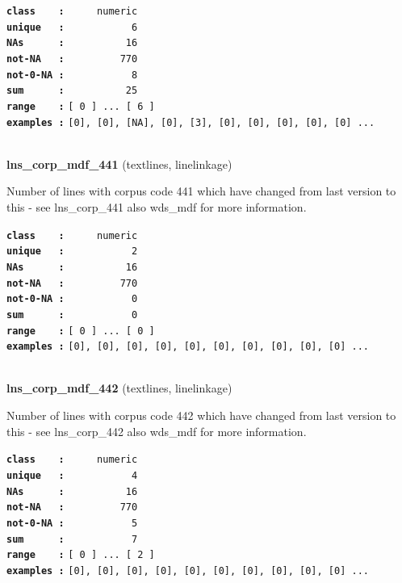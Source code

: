 \documentclass[]{article}
\begin{document}
\textbf{\texttt{class\ \ \ \ :}} \texttt{~~~~~numeric}\\
\textbf{\texttt{unique\ \ \ :}} \texttt{~~~~~~~~~~~6}\\
\textbf{\texttt{NAs\ \ \ \ \ \ :}} \texttt{~~~~~~~~~~16}\\
\textbf{\texttt{not-NA\ \ \ :}} \texttt{~~~~~~~~~770}\\
\textbf{\texttt{not-0-NA\ :}} \texttt{~~~~~~~~~~~8}\\
\textbf{\texttt{sum\ \ \ \ \ \ :}} \texttt{~~~~~~~~~~25}\\
\textbf{\texttt{range\ \ \ \ :}}
\texttt{{[}\ 0\ {]}\ ...\ {[}\ 6\ {]}}\\
\textbf{\texttt{examples\ :}}
\texttt{{[}0{]},\ {[}0{]},\ {[}NA{]},\ {[}0{]},\ {[}3{]},\ {[}0{]},\ {[}0{]},\ {[}0{]},\ {[}0{]},\ {[}0{]}\ ...}\\

~

\textbf{lns\_corp\_mdf\_441} (textlines, linelinkage)

Number of lines with corpus code 441 which have changed from last
version to this - see lns\_corp\_441 also wds\_mdf for more information.

\textbf{\texttt{class\ \ \ \ :}} \texttt{~~~~~numeric}\\
\textbf{\texttt{unique\ \ \ :}} \texttt{~~~~~~~~~~~2}\\
\textbf{\texttt{NAs\ \ \ \ \ \ :}} \texttt{~~~~~~~~~~16}\\
\textbf{\texttt{not-NA\ \ \ :}} \texttt{~~~~~~~~~770}\\
\textbf{\texttt{not-0-NA\ :}} \texttt{~~~~~~~~~~~0}\\
\textbf{\texttt{sum\ \ \ \ \ \ :}} \texttt{~~~~~~~~~~~0}\\
\textbf{\texttt{range\ \ \ \ :}}
\texttt{{[}\ 0\ {]}\ ...\ {[}\ 0\ {]}}\\
\textbf{\texttt{examples\ :}}
\texttt{{[}0{]},\ {[}0{]},\ {[}0{]},\ {[}0{]},\ {[}0{]},\ {[}0{]},\ {[}0{]},\ {[}0{]},\ {[}0{]},\ {[}0{]}\ ...}\\

~

\textbf{lns\_corp\_mdf\_442} (textlines, linelinkage)

Number of lines with corpus code 442 which have changed from last
version to this - see lns\_corp\_442 also wds\_mdf for more information.

\textbf{\texttt{class\ \ \ \ :}} \texttt{~~~~~numeric}\\
\textbf{\texttt{unique\ \ \ :}} \texttt{~~~~~~~~~~~4}\\
\textbf{\texttt{NAs\ \ \ \ \ \ :}} \texttt{~~~~~~~~~~16}\\
\textbf{\texttt{not-NA\ \ \ :}} \texttt{~~~~~~~~~770}\\
\textbf{\texttt{not-0-NA\ :}} \texttt{~~~~~~~~~~~5}\\
\textbf{\texttt{sum\ \ \ \ \ \ :}} \texttt{~~~~~~~~~~~7}\\
\textbf{\texttt{range\ \ \ \ :}}
\texttt{{[}\ 0\ {]}\ ...\ {[}\ 2\ {]}}\\
\textbf{\texttt{examples\ :}}
\texttt{{[}0{]},\ {[}0{]},\ {[}0{]},\ {[}0{]},\ {[}0{]},\ {[}0{]},\ {[}0{]},\ {[}0{]},\ {[}0{]},\ {[}0{]}\ ...}\\
\end{document}
